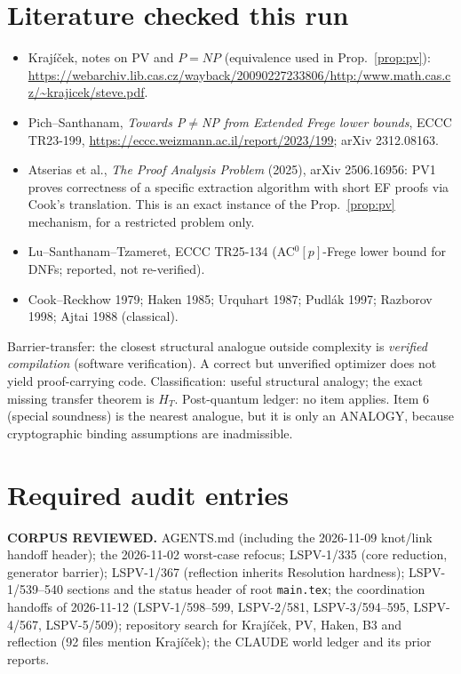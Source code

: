 \documentclass[11pt]{article}
\theoremstyle{definition}
\theoremstyle{remark}
\begin{document}
\section{Literature checked this run}
\begin{itemize}
\item Kraj\'i\v{c}ek, notes on PV and $P=NP$ (equivalence used in Prop.~\ref{prop:pv}):
\url{https://webarchiv.lib.cas.cz/wayback/20090227233806/http:/www.math.cas.cz/~krajicek/steve.pdf}.
\item Pich--Santhanam, \emph{Towards P$\ne$NP from Extended Frege lower bounds}, ECCC TR23-199,
\url{https://eccc.weizmann.ac.il/report/2023/199}; arXiv 2312.08163.
\item Atserias et al., \emph{The Proof Analysis Problem} (2025), arXiv 2506.16956: PV1 proves
correctness of a specific extraction algorithm with short EF proofs via Cook's translation.
This is an exact instance of the Prop.~\ref{prop:pv} mechanism, for a restricted problem only.
\item Lu--Santhanam--Tzameret, ECCC TR25-134 (AC$^0[p]$-Frege lower bound for DNFs; reported, not re-verified).
\item Cook--Reckhow 1979; Haken 1985; Urquhart 1987; Pudl\'ak 1997; Razborov 1998; Ajtai 1988 (classical).
\end{itemize}
Barrier-transfer: the closest structural analogue outside complexity is \emph{verified compilation}
(software verification). A correct but unverified optimizer does not yield proof-carrying code.
Classification: useful structural analogy; the exact missing transfer theorem is $H_T$.
Post-quantum ledger: no item applies. Item 6 (special soundness) is the nearest analogue, but it is
only an ANALOGY, because cryptographic binding assumptions are inadmissible.

\section{Required audit entries}
\textbf{CORPUS REVIEWED.} AGENTS.md (including the 2026-11-09 knot/link handoff header); the
2026-11-02 worst-case refocus; LSPV-1/335 (core reduction, generator barrier); LSPV-1/367
(reflection inherits Resolution hardness); LSPV-1/539--540 sections and the status header of root
\texttt{main.tex}; the coordination handoffs of 2026-11-12 (LSPV-1/598--599, LSPV-2/581,
LSPV-3/594--595, LSPV-4/567, LSPV-5/509); repository search for Kraj\'i\v{c}ek, PV, Haken, B3 and
reflection (92 files mention Kraj\'i\v{c}ek); the CLAUDE world ledger and its prior reports.
\end{document}
